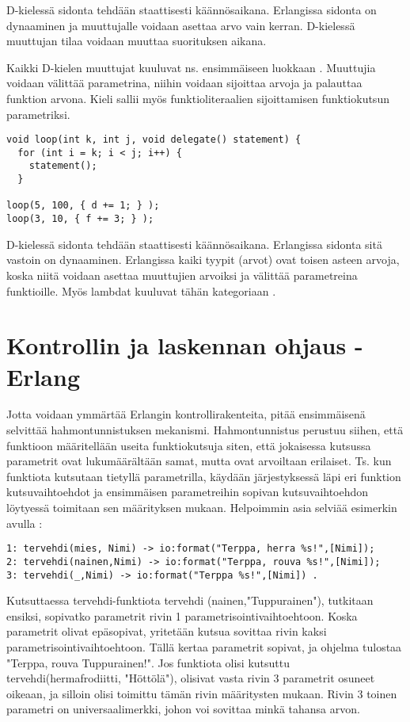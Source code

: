 \documentclass[11pt,oneside,a4paper]{article}
\begin{document}
D-kielessä sidonta tehdään staattisesti käännösaikana. Erlangissa sidonta on dynaaminen ja muuttujalle voidaan asettaa arvo vain kerran. D-kielessä muuttujan tilaa voidaan muuttaa suorituksen aikana.

Kaikki D-kielen muuttujat kuuluvat ns. ensimmäiseen luokkaan \cite{DLA13}. Muuttujia voidaan välittää parametrina, niihin voidaan sijoittaa arvoja ja palauttaa funktion arvona. Kieli sallii myös funktioliteraalien sijoittamisen funktiokutsun parametriksi.


\begin{verbatim}
void loop(int k, int j, void delegate() statement) { 
  for (int i = k; i < j; i++) { 
    statement(); 
  }
  
loop(5, 100, { d += 1; } ); 
loop(3, 10, { f += 3; } );
\end{verbatim}

D-kielessä sidonta tehdään staattisesti käännösaikana. Erlangissa sidonta sitä vastoin on
dynaaminen. Erlangissa kaiki tyypit (arvot) ovat toisen asteen arvoja, koska niitä voidaan asettaa muuttujien arvoiksi ja välittää parametreina funktioille.
Myös lambdat kuuluvat tähän kategoriaan \cite{HEB13}. 


\section{Kontrollin ja laskennan ohjaus - Erlang}
Jotta voidaan ymmärtää Erlangin kontrollirakenteita, pitää ensimmäisenä
selvittää hahmontunnistuksen mekanismi. Hahmontunnistus perustuu siihen, että
funktioon määritellään useita funktiokutsuja siten, että jokaisessa kutsussa
parametrit ovat lukumäärältään samat, mutta ovat arvoiltaan erilaiset. Ts. kun 
funktiota kutsutaan tietyllä parametrilla, käydään järjestyksessä läpi eri
funktion kutsuvaihtoehdot ja ensimmäisen parametreihin sopivan
kutsuvaihtoehdon löytyessä toimitaan sen määrityksen mukaan. Helpoimmin asia selviää esimerkin avulla \cite{HEB13}: 
\begin{verbatim}
1: tervehdi(mies, Nimi) -> io:format("Terppa, herra %s!",[Nimi]);
2: tervehdi(nainen,Nimi) -> io:format("Terppa, rouva %s!",[Nimi]);
3: tervehdi(_,Nimi) -> io:format("Terppa %s!",[Nimi]) . 
\end{verbatim}


Kutsuttaessa tervehdi-funktiota tervehdi (nainen,"Tuppurainen"), tutkitaan
ensiksi, sopivatko parametrit rivin 1 parametrisointivaihtoehtoon. Koska
parametrit olivat epäsopivat, 
yritetään kutsua sovittaa rivin kaksi parametrisointivaihtoehtoon. Tällä kertaa
parametrit sopivat, ja ohjelma tulostaa "Terppa, rouva Tuppurainen!". Jos
funktiota olisi kutsuttu
tervehdi(hermafrodiitti, "Höttölä"), olisivat vasta rivin 3 parametrit osuneet
oikeaan, ja silloin olisi toimittu tämän rivin määritysten mukaan. 
Rivin 3 toinen parametri on universaalimerkki, 
johon voi sovittaa minkä tahansa arvon.
\end{document}
